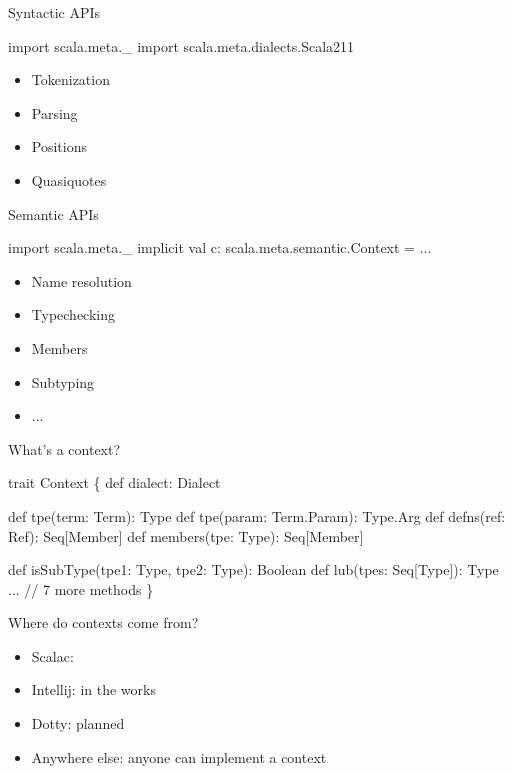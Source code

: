 \documentclass[svgnames,dvipsnames,hyperref={bookmarks=false},usepdftitle=false]{beamer}
\begin{document}
\begin{frame}[fragile]{Syntactic APIs}
\begin{semiverbatim}
import scala.meta._
import scala.meta.dialects.Scala211
\end{semiverbatim}
\vskip25pt
\begin{itemize}
\item Tokenization
\item Parsing
\item Positions
\item Quasiquotes
\end{itemize}
\end{frame}

\begin{frame}[fragile]{Semantic APIs}
\vskip20pt
\begin{semiverbatim}
import scala.meta._
implicit val c: scala.meta.semantic.Context = ...
\end{semiverbatim}
\vskip25pt
\begin{itemize}
\item Name resolution
\item Typechecking
\item Members
\item Subtyping
\item ...
\end{itemize}
\end{frame}

\begin{frame}[fragile]{What's a context?}
\begin{semiverbatim}
trait Context \{
  def dialect: Dialect

  def tpe(term: Term): Type
  def tpe(param: Term.Param): Type.Arg
  def defns(ref: Ref): Seq[Member]
  def members(tpe: Type): Seq[Member]

  def isSubType(tpe1: Type, tpe2: Type): Boolean
  def lub(tpes: Seq[Type]): Type
  ... // 7 more methods
\}
\end{semiverbatim}
\end{frame}

\begin{frame}{Where do contexts come from?}
\begin{itemize}
\item Scalac: 
\item Intellij: in the works
\item Dotty: planned
\item Anywhere else: anyone can implement a context
\end{itemize}
\end{frame}
\end{document}
